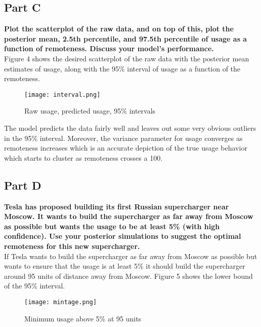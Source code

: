\documentclass{article}
\begin{document}
\subsection{Part C}
\textbf{Plot the scatterplot of the raw data, and on top of this, plot the posterior mean, 2.5th percentile, and 97.5th percentile of usage as a function of remoteness. Discuss your model's performance.}\\
Figure 4 shows the desired scatterplot of the raw data with the posterior mean estimates of usage, along with the 95\% interval of usage as a function of the remoteness.
\begin{figure}[H]
\centering
\texttt{[image: interval.png]}
\caption{Raw usage, predicted usage, 95\% intervals}
\label{deltat}
\end{figure}
\newpage
The model predicts the data fairly well and leaves out some very obvious outliers in the 95\% interval. Moreover, the variance parameter for usage converges as remoteness increases which is an accurate depiction of the true usage behavior which starts to cluster as remoteness crosses a 100.
\subsection{Part D}
\textbf{Tesla has proposed building its first Russian supercharger near Moscow. It wants to build the supercharger as far away from Moscow as possible but wants the usage to be at least 5\% (with high confidence). Use your posterior simulations to suggest the optimal remoteness for this new supercharger.}\\
If Tesla wants to build the supercharger as far away from Moscow as possible but wants to ensure that the usage is at least 5\% it should build the supercharger around 95 units of distance away from Moscow. Figure 5 shows the lower bound of the 95\% interval.
\begin{figure}[H]
\centering
\texttt{[image: mintage.png]}
\caption{Minimum usage above 5\% at 95 units}
\label{deltat}
\end{figure}
\end{document}
